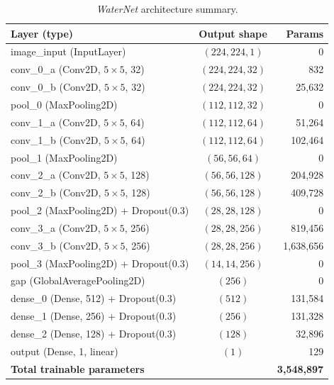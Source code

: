 \begin{table}[htbp]
    \caption{\textit{WaterNet} architecture summary.}
    \begin{center}
        \small
        \begin{tabular}{|l|c|r|}
        \hline
        \textbf{Layer (type)} & \textbf{Output shape} & \textbf{Params} \\
        \hline
        image\_input (InputLayer)
            & $(224, 224, 1)$ & 0 \\
        \hline
        conv\_0\_a (Conv2D, $5\times5$, 32)
            & $(224, 224, 32)$ & 832 \\
        conv\_0\_b (Conv2D, $5\times5$, 32)
            & $(224, 224, 32)$ & 25{,}632 \\
        pool\_0 (MaxPooling2D)
            & $(112, 112, 32)$ & 0 \\
        \hline
        conv\_1\_a (Conv2D, $5\times5$, 64)
            & $(112, 112, 64)$ & 51{,}264 \\
        conv\_1\_b (Conv2D, $5\times5$, 64)
            & $(112, 112, 64)$ & 102{,}464 \\
        pool\_1 (MaxPooling2D)
            & $(56, 56, 64)$ & 0 \\
        \hline
        conv\_2\_a (Conv2D, $5\times5$, 128)
            & $(56, 56, 128)$ & 204{,}928 \\
        conv\_2\_b (Conv2D, $5\times5$, 128)
            & $(56, 56, 128)$ & 409{,}728 \\
        pool\_2 (MaxPooling2D) + Dropout(0.3)
            & $(28, 28, 128)$ & 0 \\
        \hline
        conv\_3\_a (Conv2D, $5\times5$, 256)
            & $(28, 28, 256)$ & 819{,}456 \\
        conv\_3\_b (Conv2D, $5\times5$, 256)
            & $(28, 28, 256)$ & 1{,}638{,}656 \\
        pool\_3 (MaxPooling2D) + Dropout(0.3)
            & $(14, 14, 256)$ & 0 \\
        \hline
        gap (GlobalAveragePooling2D)
            & $(256)$ & 0 \\
        \hline
        dense\_0 (Dense, 512) + Dropout(0.3)
            & $(512)$ & 131{,}584 \\
        dense\_1 (Dense, 256) + Dropout(0.3)
            & $(256)$ & 131{,}328 \\
        dense\_2 (Dense, 128) + Dropout(0.3)
            & $(128)$ & 32{,}896 \\
        \hline
        output (Dense, 1, linear)
            & $(1)$ & 129 \\
        \hline
        \multicolumn{2}{|l|}{\textbf{Total trainable parameters}}
            & \textbf{3{,}548{,}897} \\
        \hline
        \end{tabular}
    \label{tab:waternet_arch}
    \end{center}
\end{table}

